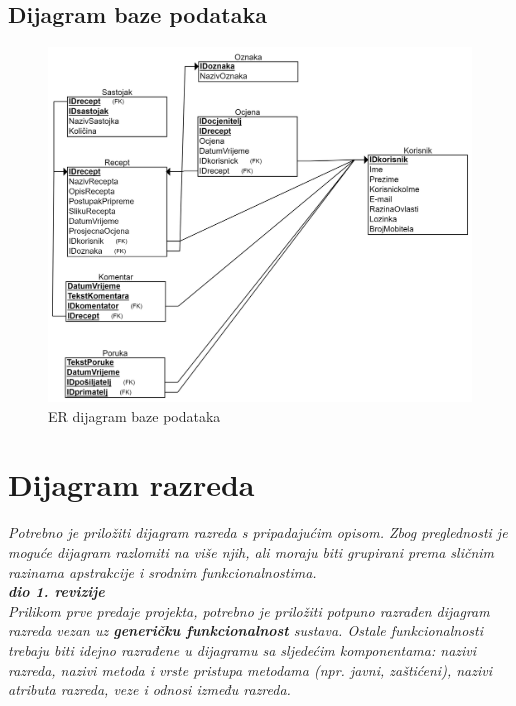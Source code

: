 			
			\subsection{Dijagram baze podataka}
			\begin{figure}[H]
				\includegraphics[scale=0.15]{slike/ER diagram baze podataka.png} %
				\centering
				\caption{ER dijagram baze podataka}
				\label{fig:ER_diagram}
			\end{figure}
		
			\eject
			
			
		\section{Dijagram razreda}
		
			\textit{Potrebno je priložiti dijagram razreda s pripadajućim opisom. Zbog preglednosti je moguće dijagram razlomiti na više njih, ali moraju biti grupirani prema sličnim razinama apstrakcije i srodnim funkcionalnostima.}\\
			
			\textbf{\textit{dio 1. revizije}}\\
			
			\textit{Prilikom prve predaje projekta, potrebno je priložiti potpuno razrađen dijagram razreda vezan uz \textbf{generičku funkcionalnost} sustava. Ostale funkcionalnosti trebaju biti idejno razrađene u dijagramu sa sljedećim komponentama: nazivi razreda, nazivi metoda i vrste pristupa metodama (npr. javni, zaštićeni), nazivi atributa razreda, veze i odnosi između razreda.}\\
			
